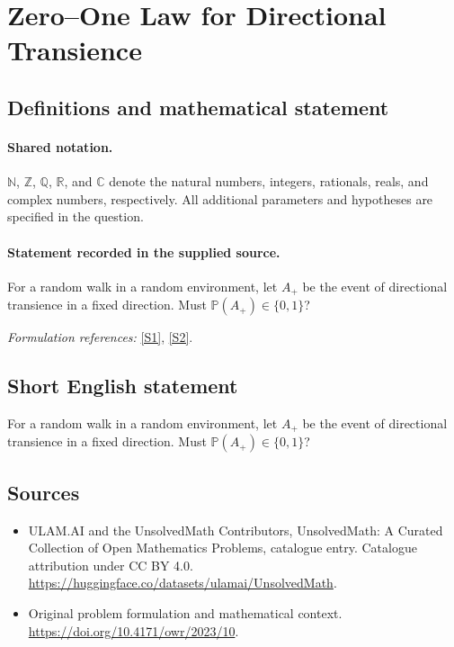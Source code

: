 \documentclass[11pt]{article}
\newcommand{\sref}[2]{\hyperlink{source:#1:#2}{[S#2]}}
\begin{document}
\section{Zero–One Law for Directional Transience}\label{statement}

\subsection{Definitions and mathematical statement}

\paragraph{Shared notation.}$\mathbb N$, $\mathbb Z$, $\mathbb Q$, $\mathbb R$, and $\mathbb C$ denote the natural numbers, integers, rationals, reals, and complex numbers, respectively. All additional parameters and hypotheses are specified in the question.


\paragraph{Statement recorded in the supplied source.}
For a random walk in a random environment, let $A_+$ be the event of directional transience in a fixed direction. Must $\mathbb P(A_+)\in\{0,1\}$?
\par\smallskip\textit{Formulation references:} \sref{statement}{1}, \sref{statement}{2}.
\subsection{Short English statement}
For a random walk in a random environment, let $A_+$ be the event of directional transience in a fixed direction. Must $\mathbb P(A_+)\in\{0,1\}$?
\subsection{Sources}
\begin{itemize}
\item[\hypertarget{source:statement:1}{S1}] ULAM.AI and the UnsolvedMath Contributors, UnsolvedMath: A Curated Collection of Open Mathematics Problems, catalogue entry. Catalogue attribution under CC BY 4.0.
\url{https://huggingface.co/datasets/ulamai/UnsolvedMath}.
\item[\hypertarget{source:statement:2}{S2}] Original problem formulation and mathematical context.
\url{https://doi.org/10.4171/owr/2023/10}.
\end{itemize}
\label{end:statement}
\end{document}
